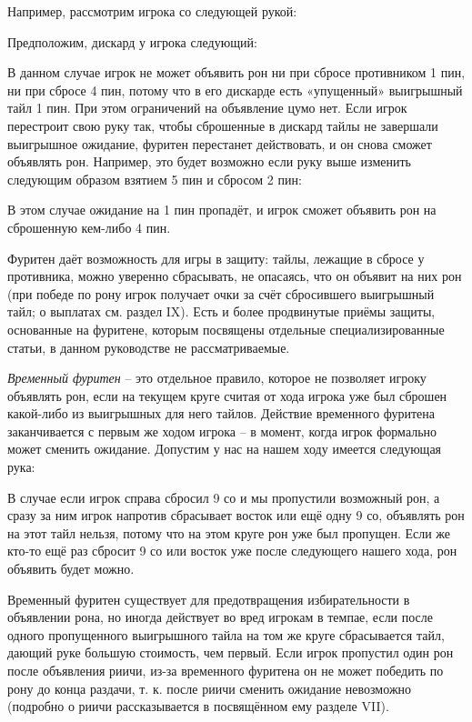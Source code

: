 Например, рассмотрим игрока со следующей рукой:


Предположим, дискард у игрока следующий:


В данном случае игрок не может объявить рон ни при сбросе противником 1 пин, ни при сбросе 4 пин, потому что в его дискарде есть «упущенный» выигрышный тайл 1 пин. При этом ограничений на объявление цумо нет. Если игрок перестроит свою руку так, чтобы сброшенные в дискард тайлы не завершали выигрышное ожидание, фуритен перестанет действовать, и он снова сможет объявлять рон. Например, это будет возможно если руку выше изменить следующим образом взятием 5 пин и сбросом 2 пин: 


В этом случае ожидание на 1 пин пропадёт, и игрок сможет объявить рон на сброшенную кем-либо 4 пин. 

Фуритен даёт возможность для игры в защиту: тайлы, лежащие в сбросе у противника, можно уверенно сбрасывать, не опасаясь, что он объявит на них рон (при победе по рону игрок получает очки за счёт сбросившего выигрышный тайл; о выплатах см. раздел IX). Есть и более продвинутые приёмы защиты, основанные на фуритене, которым посвящены отдельные специализированные статьи, в данном руководстве не рассматриваемые.

\textit{Временный фуритен} – это отдельное правило, которое не позволяет игроку объявлять рон, если на текущем круге считая от хода игрока уже был сброшен какой-либо из выигрышных для него тайлов. Действие временного фуритена заканчивается с первым же ходом игрока – в момент, когда игрок формально может сменить ожидание. Допустим у нас на нашем ходу имеется следующая рука:


В случае если игрок справа сбросил 9 со и мы пропустили возможный рон, а сразу за ним игрок напротив сбрасывает восток или ещё одну 9 со, объявлять рон на этот тайл нельзя, потому что на этом круге рон уже был пропущен. Если же кто-то ещё раз сбросит 9 со или восток уже после следующего нашего хода, рон объявить будет можно.

Временный фуритен существует для предотвращения избирательности в объявлении рона, но иногда действует во вред игрокам в темпае, если после одного пропущенного выигрышного тайла на том же круге сбрасывается тайл, дающий руке большую стоимость, чем первый. Если игрок пропустил один рон после объявления риичи, из-за временного фуритена он не может победить по рону до конца раздачи, т. к. после риичи сменить ожидание невозможно (подробно о риичи рассказывается в посвящённом ему разделе VII).
